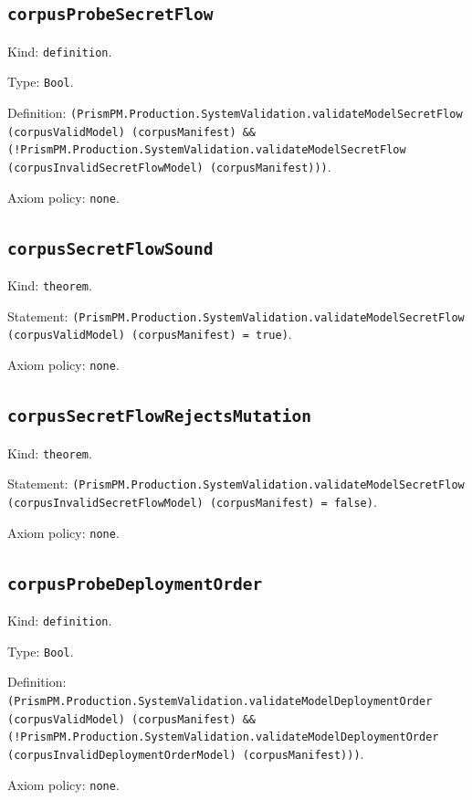 \documentclass[11pt]{article}
\begin{document}
\subsection*{\texttt{corpusProbeSecretFlow}}
\noindent Kind: \texttt{definition}.\par
\noindent Type: \texttt{Bool}.\par
\noindent Definition: \texttt{(PrismPM.Production.SystemValidation.validateModelSecretFlow (corpusValidModel) (corpusManifest) \&\& (!PrismPM.Production.SystemValidation.validateModelSecretFlow (corpusInvalidSecretFlowModel) (corpusManifest)))}.\par
\noindent Axiom policy: \texttt{none}.\par
\subsection*{\texttt{corpusSecretFlowSound}}
\noindent Kind: \texttt{theorem}.\par
\noindent Statement: \texttt{(PrismPM.Production.SystemValidation.validateModelSecretFlow (corpusValidModel) (corpusManifest) = true)}.\par
\noindent Axiom policy: \texttt{none}.\par
\subsection*{\texttt{corpusSecretFlowRejectsMutation}}
\noindent Kind: \texttt{theorem}.\par
\noindent Statement: \texttt{(PrismPM.Production.SystemValidation.validateModelSecretFlow (corpusInvalidSecretFlowModel) (corpusManifest) = false)}.\par
\noindent Axiom policy: \texttt{none}.\par
\subsection*{\texttt{corpusProbeDeploymentOrder}}
\noindent Kind: \texttt{definition}.\par
\noindent Type: \texttt{Bool}.\par
\noindent Definition: \texttt{(PrismPM.Production.SystemValidation.validateModelDeploymentOrder (corpusValidModel) (corpusManifest) \&\& (!PrismPM.Production.SystemValidation.validateModelDeploymentOrder (corpusInvalidDeploymentOrderModel) (corpusManifest)))}.\par
\noindent Axiom policy: \texttt{none}.\par
\end{document}
